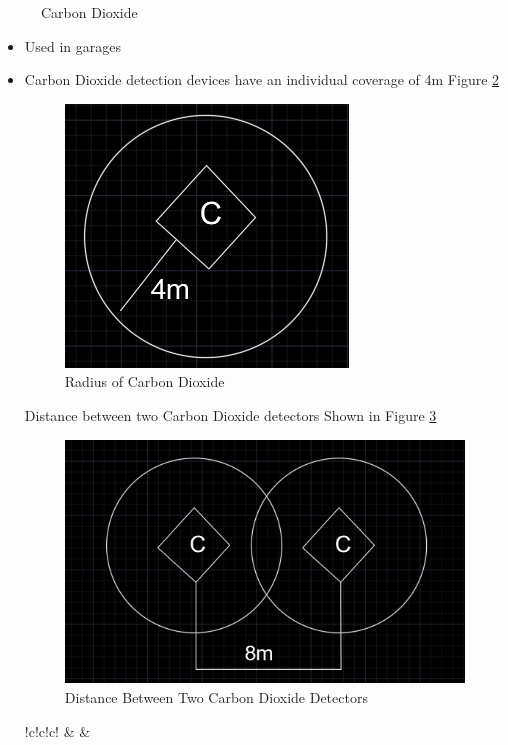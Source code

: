 \documentclass[12pt,fleqn]{book} %
\begin{document}
\begin{enumerate}
\begin{figure}[!h]
    \caption{Carbon Dioxide}
    \label{fig:hamdy 30}
\end{figure}
\begin{itemize}
    \item Used in garages
    \item Carbon Dioxide detection devices have an individual coverage of 4m
    Figure \ref{fig:hamdy 31}
    \begin{figure}[!h]
    \centering
    \includegraphics[width=0.5\linewidth]{hamdy 31.png}
    \caption{Radius of Carbon Dioxide}
    \label{fig:hamdy 31}
\end{figure}
 Distance between two Carbon Dioxide detectors Shown in Figure \ref{fig:hamdy 32}
\begin{figure}[!h]
    \centering
    \includegraphics[width=0.8\linewidth]{hamdy 32.png}
    \caption{Distance Between Two Carbon Dioxide Detectors}
    \label{fig:hamdy 32}
\end{figure}
\begin{table}[h]
\centering
\caption{Detector Table}
\label{tab:Detector table}
\begin{tabular}{!{\color[rgb]{0.584,0.702,0.843}\vrule}c!{\color{black}\vrule}c!{\color[rgb]{0.584,0.702,0.843}\vrule}c!{\color[rgb]{0.584,0.702,0.843}\vrule}} 
\hline
{}                    &                                                                                                               &                                                  \\ 

\end{tabular}
\end{table}
\end{itemize}
\end{enumerate}
\end{document}
